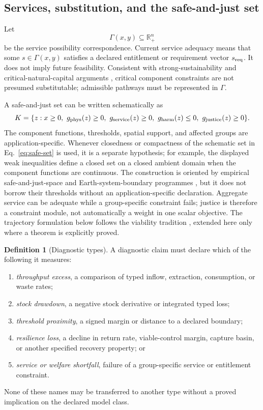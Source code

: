 \documentclass[11pt]{article}
\theoremstyle{definition}
\newtheorem{definition}{Definition}
\newcommand{\Rp}{\mathbb R_+}
\begin{document}
\subsection{Services, substitution, and the safe-and-just set}

Let
\[
\Gamma(x,y)\subseteq\Rp^n
\]
be the service possibility correspondence. Current service adequacy means that some $s\in\Gamma(x,y)$ satisfies a declared entitlement or requirement vector $s_{\rm req}$. It does not imply future feasibility. Consistent with strong-sustainability and critical-natural-capital arguments \cite{neumayer2013,ekins2003}, critical component constraints are not presumed substitutable; admissible pathways must be represented in $\Gamma$.

A safe-and-just set can be written schematically as
\begin{equation}
K=\{z:x\ge0,\ g_{\rm phys}(z)\ge0,\
 g_{\rm service}(z)\ge0,\ g_{\rm harm}(z)\le0,\
 g_{\rm justice}(z)\ge0\}.
\label{eq:safe-set}
\end{equation}
The component functions, thresholds, spatial support, and affected groups are application-specific. Whenever closedness or compactness of the schematic set in Eq.~\eqref{eq:safe-set} is used, it is a separate hypothesis; for example, the displayed weak inequalities define a closed set on a closed ambient domain when the component functions are continuous. The construction is oriented by empirical safe-and-just-space and Earth-system-boundary programmes \cite{oneill2018,rockstrom2023}, but it does not borrow their thresholds without an application-specific declaration. Aggregate service can be adequate while a group-specific constraint fails; justice is therefore a constraint module, not automatically a weight in one scalar objective. The trajectory formulation below follows the viability tradition \cite{aubin1991}, extended here only where a theorem is explicitly proved.

\begin{definition}[Diagnostic types]
A diagnostic claim must declare which of the following it measures:
\begin{enumerate}[label=(\roman*),nosep]
\item \emph{throughput excess}, a comparison of typed inflow, extraction, consumption, or waste rates;
\item \emph{stock drawdown}, a negative stock derivative or integrated typed loss;
\item \emph{threshold proximity}, a signed margin or distance to a declared boundary;
\item \emph{resilience loss}, a decline in return rate, viable-control margin, capture basin, or another specified recovery property; or
\item \emph{service or welfare shortfall}, failure of a group-specific service or entitlement constraint.
\end{enumerate}
None of these names may be transferred to another type without a proved implication on the declared model class.
\end{definition}
\end{document}
